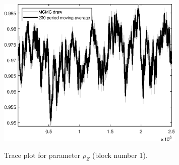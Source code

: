 \begin{figure}[H]
\centering
  \includegraphics[width=0.8\textwidth]{BRS_comovement/graphs/TracePlot_rho_Z_blck_1}\\
    \caption{Trace plot for parameter ${\rho_Z}$ (block number 1).}
\end{figure}
